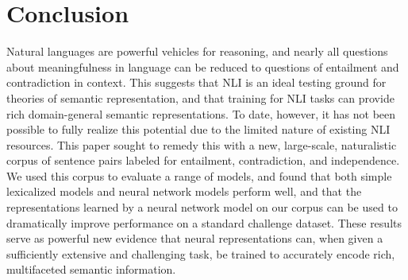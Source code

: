 \section{Conclusion}\label{sec:conclusion}

Natural languages are powerful vehicles for reasoning, 
and nearly all questions about meaningfulness
in language can be reduced to questions of entailment
and contradiction in context. This suggests that NLI is an ideal testing ground
for theories of semantic representation, and that training for NLI
tasks can provide rich domain-general semantic representations.  To
date, however, it has not been possible to fully realize this
potential due to the limited nature of existing NLI resources.  This
paper sought to remedy this with a new, large-scale, naturalistic
corpus of sentence pairs labeled for entailment, contradiction, and
independence. We used this corpus to evaluate a range of models,
and found that both simple lexicalized models and neural network
models perform well, and that the representations learned by
a neural network model on our corpus can be used to dramatically 
improve performance on a standard challenge dataset. These results 
serve as powerful new evidence that neural representations can, 
when given a sufficiently extensive and challenging task, 
be trained to accurately encode rich, multifaceted semantic
information.